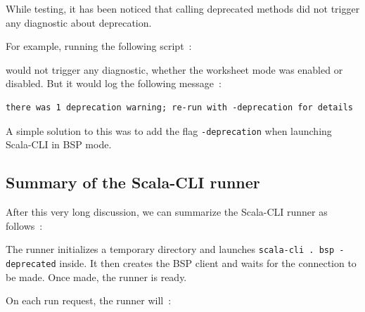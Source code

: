 \documentclass{article}
\begin{document}
While testing, it has been noticed that calling deprecated methods did not trigger any diagnostic about deprecation.

For example, running the following script~:



would not trigger any diagnostic, whether the worksheet mode was enabled or disabled. But it would log the following message~:

\begin{lstlisting}
there was 1 deprecation warning; re-run with -deprecation for details
\end{lstlisting}

A simple solution to this was to add the flag \lstinline{-deprecation} when launching Scala-CLI in BSP mode.

\subsection{Summary of the Scala-CLI runner}

After this very long discussion, we can summarize the Scala-CLI runner as follows~:

The runner initializes a temporary directory and launches \lstinline{scala-cli . bsp -deprecated} inside. It then creates the BSP client and
waits for the connection to be made. Once made, the runner is ready.

On each run request, the runner will~:
\end{document}
